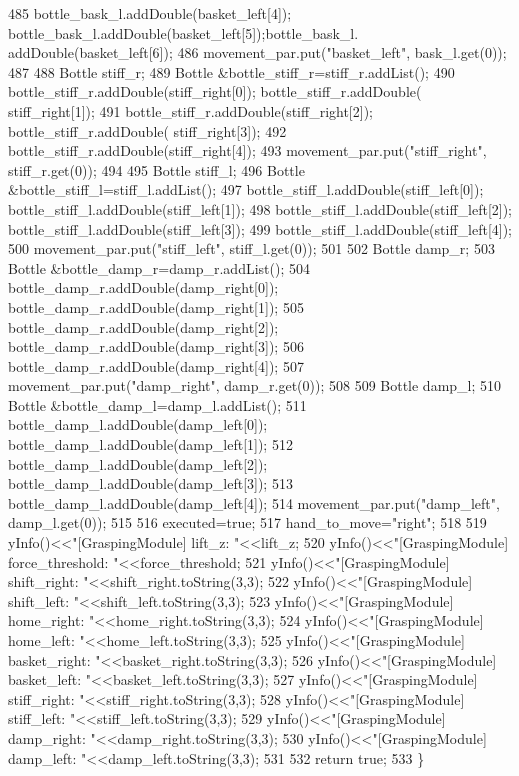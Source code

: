 \begin{DoxyCode}
485     bottle\_bask\_l.addDouble(basket_left[4]); bottle\_bask\_l.addDouble(basket_left[5]);bottle\_bask\_l.
      addDouble(basket_left[6]);
486     movement_par.put(\textcolor{stringliteral}{"basket\_left"}, bask\_l.get(0));
487 
488     Bottle stiff\_r;
489     Bottle &bottle\_stiff\_r=stiff\_r.addList();
490     bottle\_stiff\_r.addDouble(stiff_right[0]); bottle\_stiff\_r.addDouble(
      stiff_right[1]);
491     bottle\_stiff\_r.addDouble(stiff_right[2]); bottle\_stiff\_r.addDouble(
      stiff_right[3]);
492     bottle\_stiff\_r.addDouble(stiff_right[4]);
493     movement_par.put(\textcolor{stringliteral}{"stiff\_right"}, stiff\_r.get(0));
494 
495     Bottle stiff\_l;
496     Bottle &bottle\_stiff\_l=stiff\_l.addList();
497     bottle\_stiff\_l.addDouble(stiff_left[0]); bottle\_stiff\_l.addDouble(stiff_left[1]);
498     bottle\_stiff\_l.addDouble(stiff_left[2]); bottle\_stiff\_l.addDouble(stiff_left[3]);
499     bottle\_stiff\_l.addDouble(stiff_left[4]);
500     movement_par.put(\textcolor{stringliteral}{"stiff\_left"}, stiff\_l.get(0));
501 
502     Bottle damp\_r;
503     Bottle &bottle\_damp\_r=damp\_r.addList();
504     bottle\_damp\_r.addDouble(damp_right[0]); bottle\_damp\_r.addDouble(damp_right[1]);
505     bottle\_damp\_r.addDouble(damp_right[2]); bottle\_damp\_r.addDouble(damp_right[3]);
506     bottle\_damp\_r.addDouble(damp_right[4]);
507     movement_par.put(\textcolor{stringliteral}{"damp\_right"}, damp\_r.get(0));
508 
509     Bottle damp\_l;
510     Bottle &bottle\_damp\_l=damp\_l.addList();
511     bottle\_damp\_l.addDouble(damp_left[0]); bottle\_damp\_l.addDouble(damp_left[1]);
512     bottle\_damp\_l.addDouble(damp_left[2]); bottle\_damp\_l.addDouble(damp_left[3]);
513     bottle\_damp\_l.addDouble(damp_left[4]);
514     movement_par.put(\textcolor{stringliteral}{"damp\_left"}, damp\_l.get(0));
515 
516     executed=\textcolor{keyword}{true};
517     hand_to_move=\textcolor{stringliteral}{"right"};
518 
519     yInfo()<<\textcolor{stringliteral}{"[GraspingModule] lift\_z:        "}<<lift_z;
520     yInfo()<<\textcolor{stringliteral}{"[GraspingModule] force\_threshold: "}<<force_threshold;
521     yInfo()<<\textcolor{stringliteral}{"[GraspingModule] shift\_right:   "}<<shift_right.toString(3,3);
522     yInfo()<<\textcolor{stringliteral}{"[GraspingModule] shift\_left:    "}<<shift_left.toString(3,3);
523     yInfo()<<\textcolor{stringliteral}{"[GraspingModule] home\_right:    "}<<home_right.toString(3,3);
524     yInfo()<<\textcolor{stringliteral}{"[GraspingModule] home\_left:     "}<<home_left.toString(3,3);
525     yInfo()<<\textcolor{stringliteral}{"[GraspingModule] basket\_right:  "}<<basket_right.toString(3,3);
526     yInfo()<<\textcolor{stringliteral}{"[GraspingModule] basket\_left:   "}<<basket_left.toString(3,3);
527     yInfo()<<\textcolor{stringliteral}{"[GraspingModule] stiff\_right:   "}<<stiff_right.toString(3,3);
528     yInfo()<<\textcolor{stringliteral}{"[GraspingModule] stiff\_left:    "}<<stiff_left.toString(3,3);
529     yInfo()<<\textcolor{stringliteral}{"[GraspingModule] damp\_right:    "}<<damp_right.toString(3,3);
530     yInfo()<<\textcolor{stringliteral}{"[GraspingModule] damp\_left:     "}<<damp_left.toString(3,3);
531 
532     \textcolor{keywordflow}{return} \textcolor{keyword}{true};
533 \}
\end{DoxyCode}
